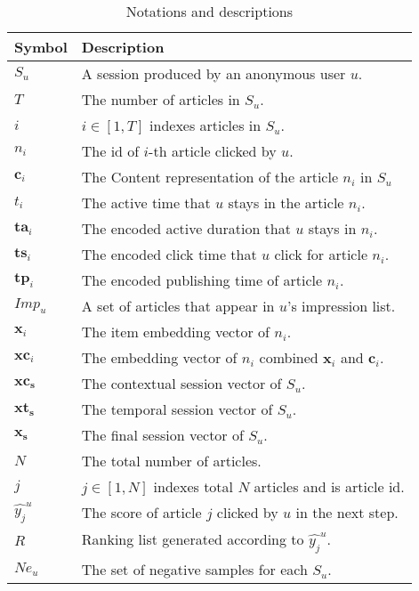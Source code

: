 \begin{table}[t]
    \caption{Notations and descriptions}
    \begin{tabular}{l|l}
    \toprule
    Symbol & Description\\
    \midrule
    $S_u$ & A session produced by an anonymous user $u$.\\
    $T$ & The number of articles in $S_u$.\\
    $i$ & $i\in [1,T]$ indexes articles in $S_u$.\\ 
    $n_i$ & The id of $i$-th article clicked by $u$.\\
    $\mathbf{c}_i$ & The Content representation of the article $n_i$ in $S_u$ \\
    $t_i$ & The active time that $u$ stays in the article $n_i$. \\
    $\mathbf{ta}_i$ & The encoded active duration that $u$ stays in $n_i$. \\
    $\mathbf{ts}_i$ & The encoded click time that $u$ click for article $n_i$. \\
    $\mathbf{tp}_i$ & The encoded publishing time of article $n_i$. \\
    $Imp_u$ & A set of articles that appear in $u$'s impression list.\\
    $\mathbf{x}_i$ & The item embedding vector of $n_i$.\\
    $\mathbf{xc}_i$ & The embedding vector of $n_i$ combined  $\mathbf{x}_i$ and $\mathbf{c}_i$.\\
    $\mathbf{xc_s}$ & The contextual session vector of $S_u$.\\
    $\mathbf{xt_s}$ & The temporal session vector of $S_u$.\\
    $\mathbf{x_s}$ & The final session vector of $S_u$.\\
    $N$ & The total number of articles.\\
    $j$ & $j\in [1,N]$ indexes total $N$ articles and is article id.\\
    $\hat{y_j}^u$ & The score of article $j$ clicked by $u$ in the next step.\\
    $R$ & Ranking list generated according to $\hat{y_j}^u$.\\
    $Ne_u$ & The set of negative samples for each $S_u$.\\
    \bottomrule
    \end{tabular}
    \label{tb:note}
\end{table}



